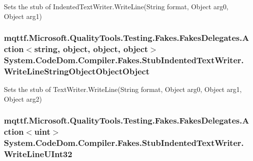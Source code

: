 Sets the stub of Indented\-Text\-Writer.\-Write\-Line(\-String format, Object arg0, Object arg1)

\hypertarget{class_system_1_1_code_dom_1_1_compiler_1_1_fakes_1_1_stub_indented_text_writer_a584f7bdbe3d044f48c121f2933a64b1e}{
\subsubsection[{Write\-Line\-String\-Object\-Object\-Object}]{\setlength{\rightskip}{0pt plus 5cm}mqttf.\-Microsoft.\-Quality\-Tools.\-Testing.\-Fakes.\-Fakes\-Delegates.\-Action$<$string, object, object, object$>$ System.\-Code\-Dom.\-Compiler.\-Fakes.\-Stub\-Indented\-Text\-Writer.\-Write\-Line\-String\-Object\-Object\-Object}}\label{class_system_1_1_code_dom_1_1_compiler_1_1_fakes_1_1_stub_indented_text_writer_a584f7bdbe3d044f48c121f2933a64b1e}


Sets the stub of Text\-Writer.\-Write\-Line(\-String format, Object arg0, Object arg1, Object arg2)

\hypertarget{class_system_1_1_code_dom_1_1_compiler_1_1_fakes_1_1_stub_indented_text_writer_a9c6b717450eb8311031f76f1b5f10496}{
\subsubsection[{Write\-Line\-U\-Int32}]{\setlength{\rightskip}{0pt plus 5cm}mqttf.\-Microsoft.\-Quality\-Tools.\-Testing.\-Fakes.\-Fakes\-Delegates.\-Action$<$uint$>$ System.\-Code\-Dom.\-Compiler.\-Fakes.\-Stub\-Indented\-Text\-Writer.\-Write\-Line\-U\-Int32}}\label{class_system_1_1_code_dom_1_1_compiler_1_1_fakes_1_1_stub_indented_text_writer_a9c6b717450eb8311031f76f1b5f10496}


